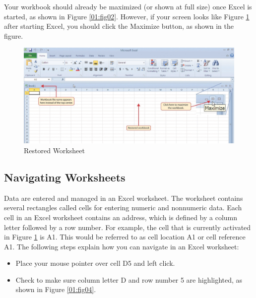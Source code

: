 Your workbook should already be maximized (or shown at full size) once Excel is started, as shown in Figure \ref{01:fig02}. However, if your screen looks like Figure \ref{01:fig03} after starting Excel, you should click the Maximize button, as shown in the figure.

\begin{figure}[H]
	\centering
	\includegraphics[width=\maxwidth{.95\linewidth}]{gfx/Ch01_fig03}
	\caption{Restored Worksheet}
	\label{01:fig03}
\end{figure}

\subsection{Navigating Worksheets}

Data are entered and managed in an Excel worksheet. The worksheet contains several rectangles called cells for entering numeric and nonnumeric data. Each cell in an Excel worksheet contains an address, which is defined by a column letter followed by a row number. For example, the cell that is currently activated in Figure \ref{01:fig03} is \textsf{A1}. This would be referred to as cell location \textsf{A1} or cell reference \textsf{A1}. The following steps explain how you can navigate in an Excel worksheet:

\begin{itemize}
	\item Place your mouse pointer over cell \textsf{D5} and left click.
	\item Check to make sure column letter D and row number 5 are highlighted, as shown in Figure \ref{01:fig04}.
\end{itemize}

